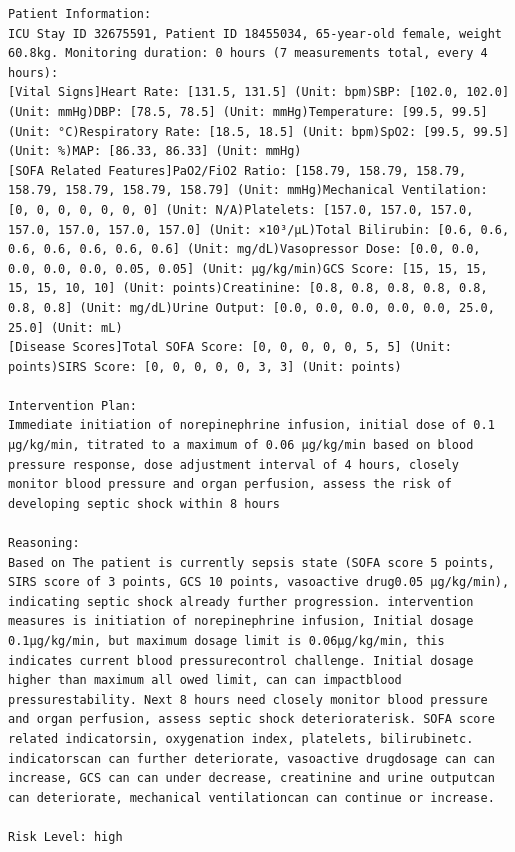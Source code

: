 \documentclass{article}
\begin{document}
\begin{lstlisting}[caption={Result for Patient 32675591}, label={lst:32675591}]
Patient Information:
ICU Stay ID 32675591, Patient ID 18455034, 65-year-old female, weight 60.8kg. Monitoring duration: 0 hours (7 measurements total, every 4 hours):
[Vital Signs]Heart Rate: [131.5, 131.5] (Unit: bpm)SBP: [102.0, 102.0] (Unit: mmHg)DBP: [78.5, 78.5] (Unit: mmHg)Temperature: [99.5, 99.5] (Unit: °C)Respiratory Rate: [18.5, 18.5] (Unit: bpm)SpO2: [99.5, 99.5] (Unit: %)MAP: [86.33, 86.33] (Unit: mmHg)
[SOFA Related Features]PaO2/FiO2 Ratio: [158.79, 158.79, 158.79, 158.79, 158.79, 158.79, 158.79] (Unit: mmHg)Mechanical Ventilation: [0, 0, 0, 0, 0, 0, 0] (Unit: N/A)Platelets: [157.0, 157.0, 157.0, 157.0, 157.0, 157.0, 157.0] (Unit: ×10³/μL)Total Bilirubin: [0.6, 0.6, 0.6, 0.6, 0.6, 0.6, 0.6] (Unit: mg/dL)Vasopressor Dose: [0.0, 0.0, 0.0, 0.0, 0.0, 0.05, 0.05] (Unit: μg/kg/min)GCS Score: [15, 15, 15, 15, 15, 10, 10] (Unit: points)Creatinine: [0.8, 0.8, 0.8, 0.8, 0.8, 0.8, 0.8] (Unit: mg/dL)Urine Output: [0.0, 0.0, 0.0, 0.0, 0.0, 25.0, 25.0] (Unit: mL)
[Disease Scores]Total SOFA Score: [0, 0, 0, 0, 0, 5, 5] (Unit: points)SIRS Score: [0, 0, 0, 0, 0, 3, 3] (Unit: points)

Intervention Plan:
Immediate initiation of norepinephrine infusion, initial dose of 0.1 μg/kg/min, titrated to a maximum of 0.06 μg/kg/min based on blood pressure response, dose adjustment interval of 4 hours, closely monitor blood pressure and organ perfusion, assess the risk of developing septic shock within 8 hours

Reasoning:
Based on The patient is currently sepsis state (SOFA score 5 points, SIRS score of 3 points, GCS 10 points, vasoactive drug0.05 μg/kg/min), indicating septic shock already further progression. intervention measures is initiation of norepinephrine infusion, Initial dosage 0.1μg/kg/min, but maximum dosage limit is 0.06μg/kg/min, this indicates current blood pressurecontrol challenge. Initial dosage higher than maximum all owed limit, can can impactblood pressurestability. Next 8 hours need closely monitor blood pressure and organ perfusion, assess septic shock deterioraterisk. SOFA score related indicatorsin, oxygenation index, platelets, bilirubinetc. indicatorscan can further deteriorate, vasoactive drugdosage can can increase, GCS can can under decrease, creatinine and urine outputcan can deteriorate, mechanical ventilationcan can continue or increase.

Risk Level: high
\end{lstlisting}
\end{document}
